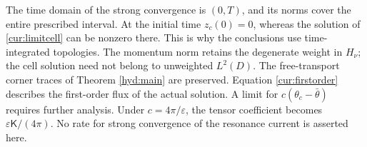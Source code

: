 \begin{remark}\label{cur:scope}
The time domain of the strong convergence is $(0,T)$, and its norms
cover the entire prescribed interval. At the initial time $z_c(0)=0$,
whereas the solution of \eqref{cur:limitcell} can be nonzero there.
This is why the conclusions use time-integrated topologies.
The momentum norm retains the degenerate weight in $H_\nu$;
the cell solution need not belong to unweighted $L^2(D)$.
The free-transport corner traces of Theorem \ref{hyd:main} are preserved.
Equation \eqref{cur:firstorder} describes the first-order flux of the
actual solution. A limit for $c(\theta_c-\bar\theta)$ requires further
analysis. Under $c=4\pi/\varepsilon$, the tensor coefficient becomes
$\varepsilon\mathsf K/(4\pi)$. No rate for strong convergence of the
resonance current is asserted here.
\end{remark}
